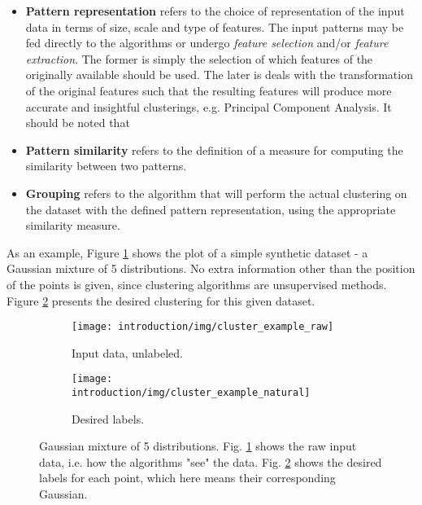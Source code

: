 \begin{itemize}
    \item \textbf{Pattern representation} refers to the choice of representation of the input data in terms of size, scale and type of features.
    The input patterns may be fed directly to the algorithms or undergo \emph{feature selection} and/or \emph{feature extraction}. The former is simply the selection of which features of the originally available should be used.
    The later is deals with the transformation of the original features such that the resulting features will produce more accurate and insightful clusterings, e.g. Principal Component Analysis.
    It should be noted that 
    \item \textbf{Pattern similarity} refers to the definition of a measure for computing the similarity between two patterns.
    \item \textbf{Grouping} refers to the algorithm that will perform the actual clustering on the dataset with the defined pattern representation, using the appropriate similarity measure.
\end{itemize}

As an example, Figure \ref{fig:intro raw} shows the plot of a simple synthetic dataset - a Gaussian mixture of 5 distributions.
No extra information other than the position of the points is given, since clustering algorithms are unsupervised methods.
Figure \ref{fig:intro natural} presents the desired clustering for this given dataset.


\begin{figure}[!ht]
    \centering
    \begin{subfigure}[b]{0.45\textwidth}
        \centering
        \texttt{[image: introduction/img/cluster\_example\_raw]}
        \caption{Input data, unlabeled.}
        \label{fig:intro raw}
    \end{subfigure}
    \begin{subfigure}[b]{0.45\textwidth}
        \centering
        \texttt{[image: introduction/img/cluster\_example\_natural]}
        \caption{Desired labels.}
        \label{fig:intro natural}
    \end{subfigure}

    \caption{Gaussian mixture of 5 distributions. Fig. \ref{fig:intro raw} shows the raw input data, i.e. how the algorithms "see" the data. Fig. \ref{fig:intro natural} shows the desired labels for each point, which here means their corresponding Gaussian.}
    \label{fig:clustering plots}
\end{figure}


